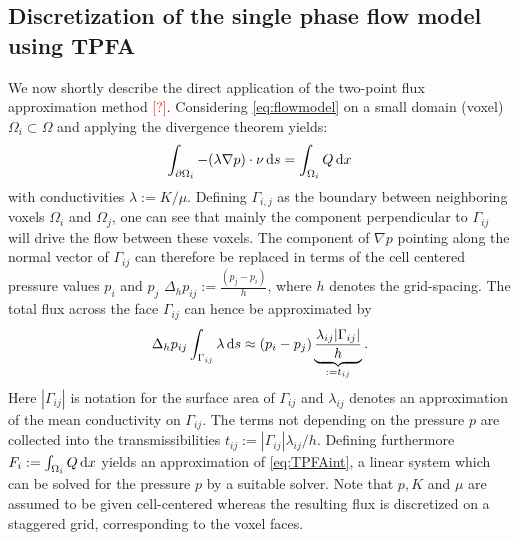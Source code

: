 \documentclass[paper=a4, fontsize=12pt,parskip=half, draft, headings=small]{scrartcl}
\newcommand{\missingsource}{\textcolor{red}{[?]}}
\begin{document}
	\subsection{Discretization of the single phase flow model using TPFA} \label{sec:numflow}

	We now shortly describe the direct application of the two-point flux approximation method \missingsource.
	Considering \eqref{eq:flowmodel} on a small domain (voxel) $\Omega_i \subset \Omega$ and applying the divergence theorem yields:
	\begin{equation}
		\int_{\partial \Omega_i}   -(\lambda \nabla p) \cdot \nu \,\mathrm{d} s = \int_{\Omega_i}Q \,\mathrm{d} x
	\label{eq:TPFAint}
	\end{equation}
	with conductivities $\lambda := K/\mu$.
	Defining $\Gamma_{i,j}$ as the boundary between neighboring voxels $\Omega_i$ and $\Omega_j$, one can see that mainly the component perpendicular to $\Gamma_{ij}$ will drive the flow between these voxels.
	The component of $\nabla p$ pointing along the normal vector of $\Gamma_{ij}$ can therefore be replaced in terms of the cell centered pressure values $p_i$ and $p_j$
 	$\Delta_h p_{ij} := \frac{(p_j - p_i)}{h}$, where $h$ denotes the grid-spacing.
	The total flux across the face $\Gamma_{ij}$ can hence be approximated by
	\[
		\Delta_h p_{ij} \int_{\Gamma_{ij}}\lambda \,\mathrm{d} s \approx (p_i - p_j) \underbrace{\frac{\lambda_{ij} \vert \Gamma_{ij} \vert}{h}}_{:=t_{ij}}.
	\]
	Here $|\Gamma_{ij}|$ is notation for the surface area of $\Gamma_{ij}$ and $\lambda_{ij}$ denotes an approximation of the mean conductivity on $\Gamma_{ij}$.
	The terms not depending on the pressure $p$ are collected into the transmissibilities $t_{ij}:=|\Gamma_{ij}|\lambda_{ij}/h$.
	Defining furthermore $F_i:=\int_{\Omega_i}Q\,\mathrm{d} x$ yields an approximation of \eqref{eq:TPFAint}, a linear system which can be solved for the pressure $p$ by a suitable solver.
	Note that $p,K$ and $\mu$ are assumed to be given cell-centered whereas the resulting flux is discretized on a staggered grid, corresponding to the voxel faces.


\end{document}
